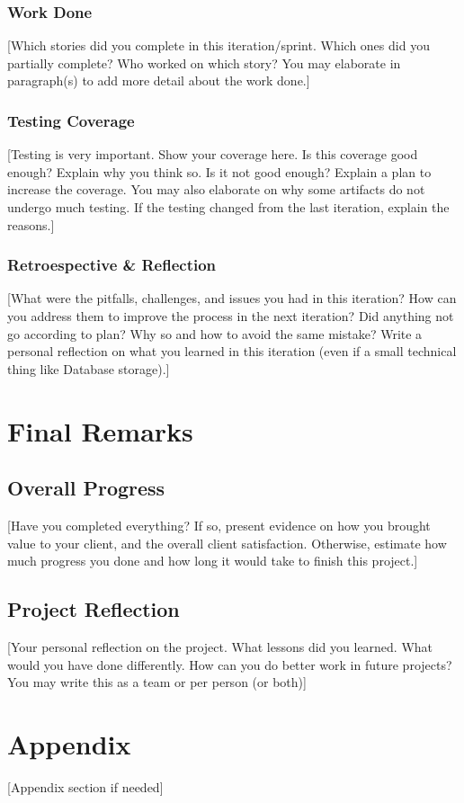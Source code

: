\documentclass{article}
\begin{document}
\subsubsection{Work Done}
[Which stories did you complete in this iteration/sprint. Which ones did you partially complete? Who worked on which story? You may elaborate in paragraph(s) to add more detail about the work done.]

\subsubsection{Testing Coverage}
[Testing is very important. Show your coverage here. Is this coverage good enough? Explain why you think so. Is it not good enough? Explain a plan to increase the coverage. You may also elaborate on why some artifacts do not undergo much testing. If the testing changed from the last iteration, explain the reasons.]

\subsubsection{Retroespective \& Reflection}
[What were the pitfalls, challenges, and issues you had in this iteration? How can you address them to improve the process in the next iteration? Did anything not go according to plan? Why so and how to avoid the same mistake? Write a personal reflection on what you learned in this iteration (even if a small technical thing like Database storage).]

\section{Final Remarks}

\subsection{Overall Progress}
[Have you completed everything? If so, present evidence on how you brought value to your client, and the overall client satisfaction. Otherwise, estimate how much progress you done and how long it would take to finish this project.]

\subsection{Project Reflection}
[Your personal reflection on the project. What lessons did you learned. What would you have done differently. How can you do better work in future projects? You may write this as a team or per person (or both)]

\section*{Appendix}
[Appendix section if needed]
\end{document}
